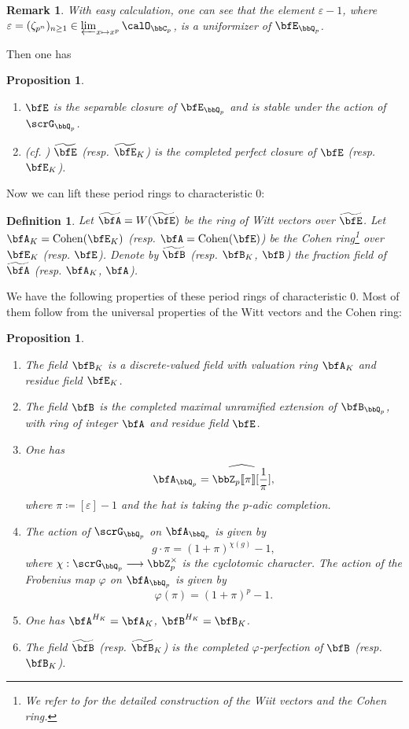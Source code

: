 \documentclass[a4paper,oneside]{amsart}
\newtheorem{remark}[theorem]{Remark}
\newtheorem{proposition}[theorem]{Proposition}
\newtheorem{definition}[theorem]{Definition}
\numberwithin{equation}{section}
\numberwithin{figure}{section}
\begin{document}
\begin{remark}
    With easy calculation, one can see that the element $\varepsilon-1$, where $\varepsilon=(\zeta_{p^n})_{n\geq 1}\in \varprojlim_{x\mapsto x^p}\calO_{\bbC_p}$, is a uniformizer of $\bfE_{\bbQ_p}$.
\end{remark}
Then one has
\begin{proposition}\leavevmode
    \begin{enumerate}
        \item $\bfE$ is the separable closure of $\bfE_{\bbQ_p}$ and is stable under the action of $\scrG_{\bbQ_p}$.
        \item (cf. \cite[Corollaire 4.3.4]{wintenberger_corps_1983}) $\widetilde{\bfE}$ (resp. $\widetilde{\bfE}_K$) is the completed perfect closure of $\bfE$ (resp. $\bfE_K$).
    \end{enumerate}
\end{proposition}

Now we can lift these period rings to characteristic $0$:
\begin{definition}
    Let $\widetilde{\bfA}=W(\widetilde{\bfE})$ be the ring of Witt vectors over $\widetilde{\bfE}$. Let $\bfA_K=\opn{Cohen}(\bfE_K)$ (resp. $\bfA=\opn{Cohen}(\bfE)$) be the Cohen ring\footnote{We refer to \cite[Chapitre IX]{bourbaki_algebre_2006} for the detailed construction of the Wiit vectors and the Cohen ring.} over $\bfE_K$ (resp. $\bfE$). Denote by $\widetilde{\bfB}$ (resp. $\bfB_K$, $\bfB$) the fraction field of $\widetilde{\bfA}$ (resp. $\bfA_K$, $\bfA$).
\end{definition}

We have the following properties of these period rings of characteristic $0$. Most of them follow from the universal properties of the Witt vectors and the Cohen ring:
\begin{proposition}\leavevmode
    \begin{enumerate}
        \item The field $\bfB_K$ is a discrete-valued field with valuation ring $\bfA_K$ and residue field $\bfE_K$.
        \item The field $\bfB$ is the completed maximal unramified extension of $\bfB_{\bbQ_p}$, with ring of integer $\bfA$ and residue field $\bfE$.
        \item One has
              $$\bfA_{\bbQ_p}=\widehat{\bbZ_p\llbracket\pi\rrbracket[\frac{1}{\pi}]},$$
              where $\pi\coloneqq [\varepsilon]-1$ and the hat is taking the $p$-adic completion.
        \item The action of $\scrG_{\bbQ_p}$ on $\bfA_{\bbQ_p}$ is given by
              $$g\cdot\pi=(1+\pi)^{\chi(g)}-1,$$ where $\chi:\scrG_{\bbQ_p}\lto \bbZ_p^\times$ is the cyclotomic character. The action of the Frobenius map $\varphi$ on $\bfA_{\bbQ_p}$ is given by
              $$\varphi(\pi)=(1+\pi)^p-1.$$
        \item One has $\bfA^{H_K}=\bfA_K$, $\bfB^{H_K}=\bfB_K$.
        \item The field $\widetilde{\bfB}$ (resp. $\widetilde{\bfB}_K$) is the completed $\varphi$-perfection of $\bfB$ (resp. $\bfB_K$).
    \end{enumerate}
\end{proposition}
\end{document}
